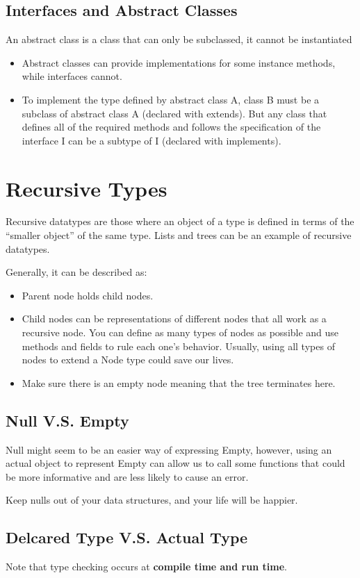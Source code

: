 \documentclass[letterpaper,12pt]{article}
\begin{document}
\subsection{Interfaces and Abstract Classes}
An abstract class is a class that can only be subclassed, it cannot be
instantiated
\begin{itemize}
      \item Abstract classes can provide implementations for some instance methods, while
            interfaces cannot.
      \item To implement the type defined by abstract class A, class B must be a subclass
            of abstract class A (declared with extends). But any class that defines all of
            the required methods and follows the specification of the interface I can be a subtype of I (declared with implements).
\end{itemize}

\section{Recursive Types}
Recursive datatypes are those where an object of a type is defined in terms of the ``smaller object'' of the same type. Lists and trees can be an example of recursive datatypes.

Generally, it can be described as:
\begin{itemize}
      \item Parent node holds child nodes.
      \item Child nodes can be representations of different nodes that all work as a recursive node. You can define as many types of nodes as possible and use methods and fields to rule each one's behavior. Usually, using all types of nodes to extend a Node type could save our lives.
      \item Make sure there is an empty node meaning that the tree terminates here.
\end{itemize}
\subsection{Null V.S. Empty}
Null might seem to be an easier way of expressing Empty, however, using an actual object to represent Empty can allow us to call some functions that could be more informative and are less likely to cause an error.

Keep nulls out of your data structures, and your life will be happier.

\subsection{Delcared Type V.S. Actual Type}
Note that type checking occurs at \textbf{compile time and run time}.
\end{document}

